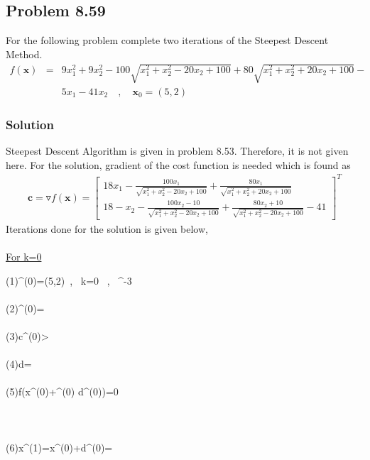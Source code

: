 \documentclass[]{report}
\begin{document}
\subsection*{Problem 8.59}
For the following problem complete two iterations of the Steepest Descent Method.
\begin{eqnarray*}
f\left(\mathbf x\right)&=&9x_1^2+9x_2^2-100\sqrt{x_1^2+x_2^2-20x_2+100}+80\sqrt{x_1^2+x_2^2+20x_2+100}-\\&&5x_1-41x_2 \quad,\quad \mathbf{x}_0=\left(5,2\right)
\end{eqnarray*}
\subsubsection*{Solution}
Steepest Descent Algorithm is given in problem 8.53. Therefore, it is not given here. For the solution, gradient of the cost function is needed which is found as
\begin{eqnarray*}
\mathbf{c}=\mathbf \triangledown f\left(\mathbf x\right)=\left[\begin{array}{c}
18x_1-\frac{100x_1}{\sqrt{x_1^2+x_2^2-20x_2+100}}+\frac{80x_1}{\sqrt{x_1^2+x_2^2+20x_2+100}} \\ 18-x_2-\frac{100x_2-10}{\sqrt{x_1^2+x_2^2-20x_2+100}}+\frac{80x_2+10}{\sqrt{x_1^2+x_2^2-20x_2+100}}-41\end{array}\right]^T
\end{eqnarray*}
Iterations done for the solution is given below,
\\
~
\\
\underline{For k=0}
\begin{program}
\left(1\right)\quad {}^{(0)}=\left(5,2\right)\ , \, k=0 \ , \ ^{-3}\\~ \\
\left(2\right)\quad {}^{(0)}=\left[62.7693 \ , \ 153.6460\right]\\~  \\
\left(3\right)\quad \lvert \mathbf c^{(0)}>\epsilon\\~  \\
\left(4\right)\quad \mathbf d=\left[-62.7693 \ , \ -153.6460\right]\\~  \\
\left(5\right)\quad \delta f\left(\mathbf x^{(0)}+\alpha^{(0)} \mathbf d^{(0)}\right)=0\\~\\
\quad \quad \quad \quad \quad \quad \quad \quad \quad {}\\~\\
\left(6\right)\quad \mathbf x^{(1)}=\mathbf x^{(0)}+\mathbf d^{(0)}=\left[0.802\ , \ -8.279\right]\\~  \\
\end{program}~
\end{document}
